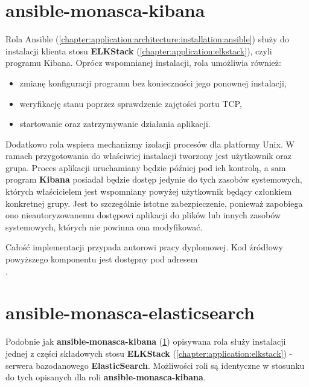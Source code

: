 \section{ansible-monasca-kibana}
\label{chapter:application:own_work:ansible_kibana}

    Rola Ansible (\ref{chapter:application:architecture:installation:ansible}) służy do 
    instalacji klienta stosu \textbf{ELKStack} (\ref{chapter:application:elkstack}), czyli programu Kibana.
    Oprócz wspomnianej instalacji, rola umożliwia również:
    \begin{itemize}
        \item zmianę konfiguracji programu bez konieczności jego ponownej instalacji,
        \item weryfikację stanu poprzez sprawdzenie zajętości portu TCP,
        \item startowanie oraz zatrzymywanie działania aplikacji.
    \end{itemize}
    Dodatkowo rola wspiera mechanizmy izolacji procesów dla platformy Unix. W ramach przygotowania
    do właściwiej instalacji tworzony jest użytkownik oraz grupa. Proces aplikacji uruchamiany będzie później
    pod ich kontrolą, a sam program \textbf{Kibana} posiadał będzie dostęp jedynie do tych zasobów
    systemowych, których właścicielem jest wspomniany powyżej użytkownik będący członkiem konkretnej grupy.
    Jest to szczególnie istotne zabezpieczenie, ponieważ zapobiega ono nieautoryzowanemu dostępowi aplikacji
    do plików lub innych zasobów systemowych, których nie powinna ona modyfikować.
    
    Całość implementacji przypada autorowi pracy dyplomowej. Kod źródłowy powyższego komponentu jest
    dostępny pod adresem \\ .

\section{ansible-monasca-elasticsearch}
\label{chapter:application:own_work:ansible_elasticsearch}

    Podobnie jak \textbf{ansible-monasca-kibana} (\ref{chapter:application:own_work:ansible_kibana}) opisywana
    rola służy instalacji jednej z części składowych stosu \textbf{ELKStack} (\ref{chapter:application:elkstack}) - 
    serwera bazodanowego \textbf{ElasticSearch}. Możliwości roli są identyczne w stosunku do tych opisanych dla roli 
    \textbf{ansible-monasca-kibana}.
    
